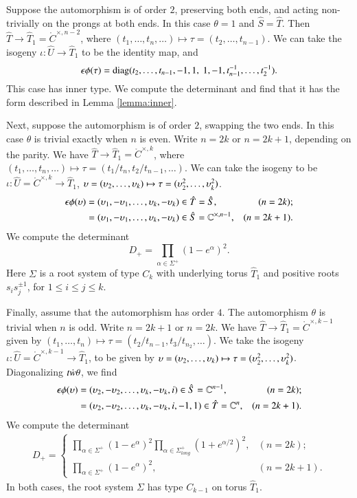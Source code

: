 Suppose the automorphism is of order $2$, preserving both ends, and
acting non-trivially on the prongs at both ends.  In this case
$\theta=1$ and $\hat S = \hat T$.  Then $\hat T\to \hat T_1 =
\ring{C}^{\times,n-2}$, where $(t_1,\ldots,t_n,\ldots)\mapsto \tau =
(t_2,\ldots,t_{n-1})$.  We can take the isogeny $\iota:\hat U\to \hat
T_1$ to be the identity map, and
\[
\epsilon\phi(\tau) 
= \op{diag}(t_2,\ldots,t_{n-1},-1,1,\ 1,-1,t_{n-1}^{-1},\ldots,t_2^{-1}).
\]
This case has inner type.  We compute the determinant and find that it
has the form described in Lemma \ref{lemma:inner}.

Next, suppose the automorphism is of order $2$, swapping the two ends.
In this case $\theta$ is trivial exactly when $n$ is even.  Write
$n=2k$ or $n=2k+1$, depending on the parity.  We have $\hat T\to \hat
T_1 = \ring{C}^{\times,k}$, where $(t_1,\ldots,t_n,\ldots)\mapsto
\tau=(t_1/t_n,t_2/t_{n-1},\ldots)$.  We can take the isogeny to be
$\iota:\hat U =\ring{C}^{\times,k}\to \hat T_1$, $\upsilon =
(\upsilon_2,\ldots,\upsilon_k)\mapsto \tau=(\upsilon_2^2,\ldots,\upsilon_k^2)$.
\begin{align*}
\epsilon \phi(\upsilon)
&= (\upsilon_1,-\upsilon_1,\ldots,\upsilon_k,-\upsilon_k) \in \hat T = \hat S, 
&(n=2k);\\
&= (\upsilon_1,-\upsilon_1,\ldots,\upsilon_k,-\upsilon_k)\in \hat S = \mathbb{C}^{\times,n-1}, 
&(n=2k+1).
\end{align*}
We compute the determinant
\begin{equation}
D_+ = \prod_{\alpha\in\Sigma^+} (1-e^\alpha)^2.
\end{equation}
Here $\Sigma$ is a root system of type $C_k$ with underlying torus
$\hat T_1$ and positive roots $s_i s_j^{\pm 1}$, for $1\le i\le j\le
k$.

Finally, assume that the automorphism has order $4$.  The automorphism
$\theta$ is trivial when $n$ is odd.  Write $n=2k+1$ or $n=2k$.  We
have $\hat T\to \hat T_1 = \ring{C}^{\times,k-1}$ given by
$(t_1,\ldots,t_n)\mapsto \tau = (t_2/t_{n-1},t_3/t_{n_2},\ldots)$.  We
take the isogeny $\iota:\hat U =\ring{C}^{\times,k-1}\to \hat T_1$, to
be given by $\upsilon = (\upsilon_2,\ldots,\upsilon_k)\mapsto \tau =
(\upsilon_2^2,\ldots,\upsilon_k^2)$.  Diagonalizing $t\dot w\theta$, we find
\begin{align}
\epsilon\phi(\upsilon) 
&= (\upsilon_2,-\upsilon_2,\ldots,\upsilon_k,-\upsilon_k,i)\in \hat S=\mathbb{C}^{n-1},
&(n=2k);\\
&= (\upsilon_2,-\upsilon_2,\ldots,\upsilon_k,-\upsilon_k,i,-1,1)\in \hat T = \mathbb{C}^n,
&(n=2k+1).
\end{align}
We compute the determinant
\begin{align*}
D_+ = \begin{cases}\prod_{\alpha\in \Sigma^+} (1-e^\alpha)^2 \prod_{\alpha\in \Sigma^+_{long}} (1+e^{\alpha/2})^2,&(n=2k);\\
          \prod_{\alpha\in\Sigma^+} (1-e^\alpha)^2,&(n=2k+1).
          \end{cases}
\end{align*}
In both cases, the root system $\Sigma$ has type $C_{k-1}$ on torus
$\hat T_1$.


